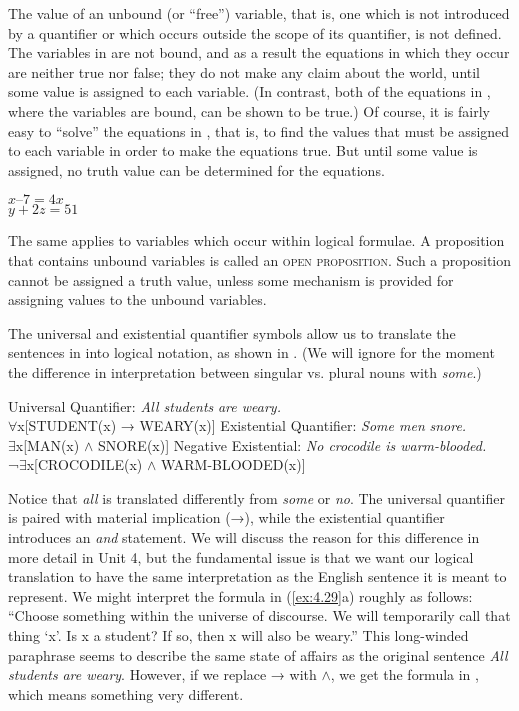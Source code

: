 The value of an unbound (or “free”) variable, that is, one which is not introduced by a quantifier or which occurs outside the scope of its quantifier, is not defined. The variables in  are not bound, and as a result the equations in which they occur are neither true nor false; they do not make any claim about the world, until some value is assigned to each variable. (In contrast, both of the equations in , where the variables are bound, can be shown to be true.) Of course, it is fairly easy to “solve” the equations in , that is, to find the values that must be assigned to each variable in order to make the equations true. But until some value is assigned, no truth value can be determined for the equations.


\ea \label{ex:4.28}
\ea  $x–7 = 4x$\\
\ex  $y+2z = 51$
                       \z
\z


The same applies to variables which occur within logical formulae. A proposition that contains unbound variables is called an \textsc{open proposition}. Such a proposition cannot be assigned a truth value, unless some mechanism is provided for assigning values to the unbound variables.



The universal and existential quantifier symbols allow us to translate the sentences in  into logical notation, as shown in . (We will ignore for the moment the difference in interpretation between singular vs. plural nouns with \textit{some}.)


\ea \label{ex:4.29}
\ea  Universal Quantifier: \textit{All students} \textit{are weary.}\\
${\forall}$x[STUDENT(x) → WEARY(x)]
\ex  Existential Quantifier: \textit{Some men} \textit{snore.}\\
${\exists}$x[MAN(x) $\wedge$ SNORE(x)]
\ex  Negative Existential: \textit{No crocodile is warm-blooded.}\\
¬${\exists}$x[CROCODILE(x) $\wedge$ WARM-BLOODED(x)]
\z \z

Notice that \textit{all} is translated differently from \textit{some} or \textit{no}. The universal quantifier is paired with material implication (→), while the existential quantifier introduces an \textit{and} statement. We will discuss the reason for this difference in more detail in Unit 4, but the fundamental issue is that we want our logical translation to have the same interpretation as the English sentence it is meant to represent. We might interpret the formula in (\ref{ex:4.29}a) roughly as follows: “Choose something within the universe of discourse. We will temporarily call that thing ‘x’. Is x a student? If so, then x will also be weary.” This long-winded paraphrase seems to describe the same state of affairs as the original sentence \textit{All students} \textit{are weary}. However, if we replace → with $\wedge$, we get the formula in , which means something very different.


